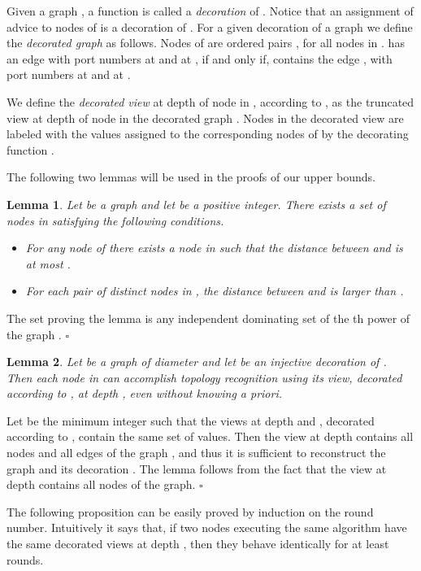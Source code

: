 \documentclass{article}
\newcommand*{\qed}{\hfill\ensuremath{\square}}
\newtheorem{lemma}{Lemma}[section]
\newenvironment{proof}{\noindent{\bf Proof:}}{\qed}
\begin{document}
Given a graph , a function  is called a {\em decoration} of .
Notice that an assignment of advice to nodes of  is a decoration of .
For a given decoration  of a graph  we define the {\em decorated graph}  as follows. Nodes of  are ordered pairs , for all nodes  in .
 has an edge  with port numbers  at  and  at , if and only if,
 contains the edge , with port numbers  at  and  at .

We define  the {\em decorated view} at depth  of node  in , according to , as the truncated view at depth  of node  in the decorated graph . Nodes in the decorated view are labeled with the values assigned to the corresponding nodes of  by the decorating function .

The following two lemmas will be used in the proofs of our upper bounds.

\begin{lemma}\label{lemDominating}
Let  be a graph and let  be a positive integer. There exists a set  of nodes in   satisfying the following conditions. 
\begin{itemize}
\item For any node  of  there exists a node  in  such that the distance between  and  is at most .
\item For each pair  of distinct nodes in , the distance between  and  is larger than .
\end{itemize}
\end{lemma}
\begin{proof}
The set proving the lemma is any independent dominating set of the th power of the graph .
\end{proof}

\begin{lemma}\label{lemUniqueLabels}
Let  be a graph of diameter  and let  be an injective  decoration of . Then each node  in  can accomplish topology recognition using its view, decorated according to , at depth , even without knowing  a priori.
\end{lemma}
\begin{proof}
Let  be the minimum integer such that the views at depth   and , decorated according to , contain the same set of values.
Then the view at depth  contains all nodes and all edges of the graph , and thus it is sufficient to reconstruct the graph  and its decoration .
The lemma follows from the fact that the view at depth  contains all nodes of the graph.  
\end{proof}

The following proposition can be easily proved by induction on the round number.
Intuitively it says that, if two nodes executing the same algorithm have the same decorated views at depth , then they behave identically for at least  rounds.
\end{document}
